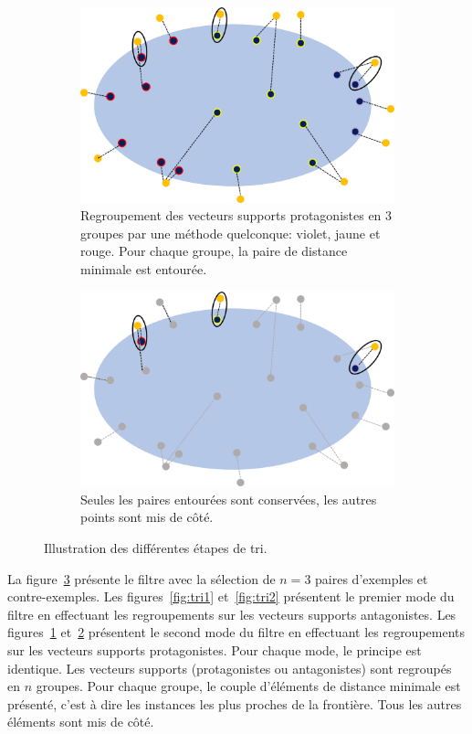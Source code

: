 \begin{figure}[h!tpb]
    \begin{subfigure}[t]{0.45\textwidth}
      \centering\includegraphics[width=\textwidth]{S4-Explicabilite_globale/figures/tri3.png}
      \caption{Regroupement des vecteurs supports protagonistes en 3 groupes par une méthode quelconque: violet, jaune et rouge. Pour chaque groupe, la paire de distance minimale est entourée.}
      \label{fig:tri3}
    \end{subfigure} \qquad
    \begin{subfigure}[t]{0.45\textwidth}
      \centering\includegraphics[width=\textwidth]{S4-Explicabilite_globale/figures/tri4.png}
      \caption{Seules les paires entourées sont conservées, les autres points sont mis de côté.} \label{fig:tri4}
    \end{subfigure}

    \caption{Illustration des différentes étapes de tri. } \label{fig:tri}
\end{figure}

La figure~\ref{fig:tri} présente le filtre avec la sélection de $n=3$ paires d'exemples et contre-exemples. Les figures~\ref{fig:tri1} et~\ref{fig:tri2} présentent le premier mode du filtre en effectuant les regroupements sur les vecteurs supports antagonistes. Les figures~\ref{fig:tri3} et~\ref{fig:tri4} présentent le second mode du filtre en effectuant les regroupements sur les vecteurs supports protagonistes.
Pour chaque mode, le principe est identique. Les vecteurs supports (protagonistes ou antagonistes) sont regroupés en $n$ groupes. Pour chaque groupe, le couple d'éléments de distance minimale est présenté, c'est à dire les instances les plus proches de la frontière. Tous les autres éléments sont mis de côté.

